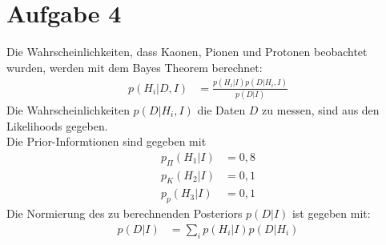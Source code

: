 \section*{Aufgabe 4}
Die Wahrscheinlichkeiten, dass Kaonen, Pionen und Protonen beobachtet wurden, werden mit dem Bayes Theorem berechnet:
\begin{align*}
	p(H_i|D,I) &= \frac{p(H_i|I) p(D|H_i,I)}{p(D|I)}
\end{align*}
Die Wahrscheinlichkeiten $p(D|H_i,I)$ die Daten $D$ zu messen, sind aus den Likelihoods gegeben. \\
Die Prior-Informtionen sind gegeben mit
\begin{align*}
	p_\Pi(H_1|I) &= 0,8	\\
	p_K(H_2|I) &= 0,1	\\
	p_p(H_3|I) &= 0,1
\end{align*}
Die Normierung des zu berechnenden Posteriors $p(D|I)$ ist gegeben mit:
\begin{align*}
	p(D|I) &= \sum\limits_i p(H_i|I) p(D|H_i)
\end{align*}


